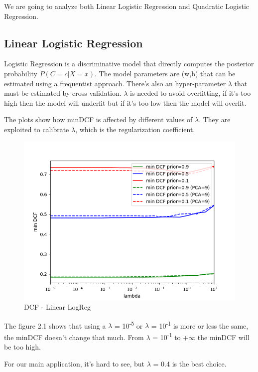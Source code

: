 \documentclass[english]{report}
\begin{document}
We are going to analyze both Linear Logistic Regression and Quadratic Logistic Regression.
\subsection{Linear Logistic Regression}

Logistic Regression is a discriminative model that directly computes the posterior probability \(P(C=c|X=x)\). 
The model parameters are (w,b) that can be estimated using a frequentist approach. There's also an hyper-parameter $\lambda$
that must be estimated by cross-validation. $\lambda$ is needed to avoid overfitting, if it's too high then the model will
underfit but if it's too low then the model will overfit.\newline

The plots show how minDCF is affected by different values of $\lambda$.  They are exploited to calibrate
$\lambda$, which is the regularization coefficient.

\begin{figure}[H]
    \centering
    \includegraphics[scale=0.5]{../../images/validation/LR_PCA_minDCF_comparison}
    \caption{DCF - Linear LogReg}
    \label{DCF - Linear LogReg}
\end{figure}

The figure 2.1 shows that using a $\lambda$ = 10\textsuperscript{-5} or $\lambda$ = 10\textsuperscript{-1}
is more or less the same, the minDCF doesn't change that much. From $\lambda$ = 10\textsuperscript{-1} to
+$\infty$ the minDCF will be too high.

For our main application, it's hard to see, but $\lambda$ = 0.4 is the best choice.
\end{document}
